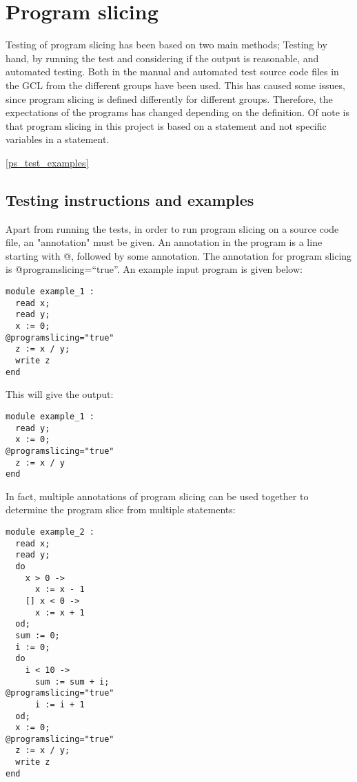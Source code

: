 \section{Program slicing}

Testing of program slicing has been based on two main methods;
Testing by hand, by running the test and considering if the output
is reasonable, and automated testing. Both in the manual and automated
test source code files in the GCL from the different groups have been
used. This has caused some issues, since program slicing is defined
differently for different groups. Therefore, the expectations of the
programs has changed depending on the definition.
Of note is that program slicing in this project is based on a statement
and not specific variables in a statement.

\ref{ps_test_examples}

\subsection{Testing instructions and examples}

Apart from running the tests, in order to run program slicing
on a source code file, an "annotation" must be given. An annotation in the program
is a line starting with @, followed by some annotation.
The annotation for program slicing is @programslicing=``true''.
An example input program is given below:

\begin{lstlisting}
module example_1 :
  read x;
  read y;
  x := 0;
@programslicing="true"
  z := x / y;
  write z
end
\end{lstlisting}

This will give the output:

\begin{lstlisting}
module example_1 :
  read y;
  x := 0;
@programslicing="true"
  z := x / y
end
\end{lstlisting}

In fact, multiple annotations of program slicing can be used together
to determine the program slice from multiple statements:

\begin{lstlisting}
module example_2 :
  read x;
  read y;
  do
    x > 0 ->
      x := x - 1
    [] x < 0 ->
      x := x + 1
  od;
  sum := 0;
  i := 0;
  do
    i < 10 ->
      sum := sum + i;
@programslicing="true"
      i := i + 1
  od;
  x := 0;
@programslicing="true"
  z := x / y;
  write z
end
\end{lstlisting}

